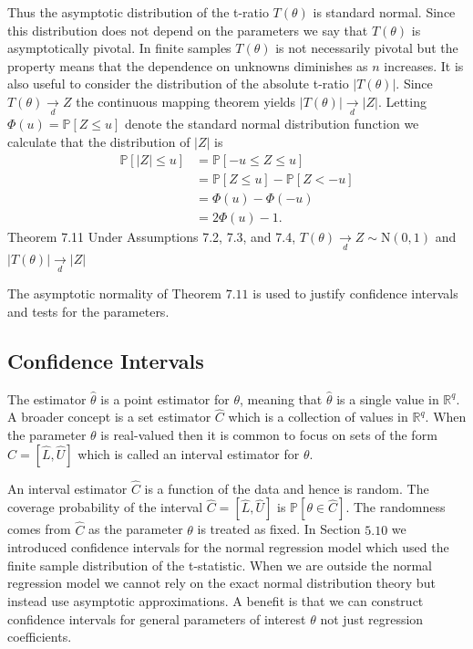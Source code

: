 \documentclass[10pt]{article}
\begin{document}
Thus the asymptotic distribution of the t-ratio $T(\theta)$ is standard normal. Since this distribution does not depend on the parameters we say that $T(\theta)$ is asymptotically pivotal. In finite samples $T(\theta)$ is not necessarily pivotal but the property means that the dependence on unknowns diminishes as $n$ increases. It is also useful to consider the distribution of the absolute t-ratio $|T(\theta)|$. Since $T(\theta) \underset{d}{\longrightarrow} Z$ the continuous mapping theorem yields $|T(\theta)| \underset{d}{\longrightarrow}|Z|$. Letting $\Phi(u)=\mathbb{P}[Z \leq u]$ denote the standard normal distribution function we calculate that the distribution of $|Z|$ is
$$
\begin{aligned}
\mathbb{P}[|Z| \leq u] &=\mathbb{P}[-u \leq Z \leq u] \\
&=\mathbb{P}[Z \leq u]-\mathbb{P}[Z<-u] \\
&=\Phi(u)-\Phi(-u) \\
&=2 \Phi(u)-1 .
\end{aligned}
$$
Theorem 7.11 Under Assumptions 7.2, 7.3, and 7.4, $T(\theta) \underset{d}{\longrightarrow} Z \sim \mathrm{N}(0,1)$ and $|T(\theta)| \underset{d}{\longrightarrow}|Z|$

The asymptotic normality of Theorem $7.11$ is used to justify confidence intervals and tests for the parameters.

\subsection{Confidence Intervals}
The estimator $\hat{\theta}$ is a point estimator for $\theta$, meaning that $\widehat{\theta}$ is a single value in $\mathbb{R}^{q}$. A broader concept is a set estimator $\widehat{C}$ which is a collection of values in $\mathbb{R}^{q}$. When the parameter $\theta$ is real-valued then it is common to focus on sets of the form $\widehat{C}=[\widehat{L}, \widehat{U}]$ which is called an interval estimator for $\theta$.

An interval estimator $\widehat{C}$ is a function of the data and hence is random. The coverage probability of the interval $\widehat{C}=[\widehat{L}, \widehat{U}]$ is $\mathbb{P}[\theta \in \widehat{C}]$. The randomness comes from $\widehat{C}$ as the parameter $\theta$ is treated as fixed. In Section $5.10$ we introduced confidence intervals for the normal regression model which used the finite sample distribution of the t-statistic. When we are outside the normal regression model we cannot rely on the exact normal distribution theory but instead use asymptotic approximations. A benefit is that we can construct confidence intervals for general parameters of interest $\theta$ not just regression coefficients.
\end{document}
